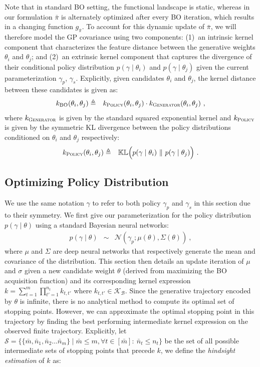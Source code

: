 Note that in standard BO setting, the functional landscape is static, whereas in our formulation $\bar{\pi}$ is alternately optimized after every BO iteration, which results in a changing function $g_{\bar{\pi}}$. To account for this dynamic update of ${\bar{\pi}}$, we will therefore model the GP covariance using two components: (1)~an intrinsic kernel component that characterizes the feature distance between the generative weights $\theta_i$ and $\theta_j$; and (2)~an extrinsic kernel component that captures the divergence of their conditional policy distribution $p(\gamma \mid \theta_i)$ and $p(\gamma \mid \theta_j)$ given the current parameterization $\gamma_p$, $\gamma_s$. Explicitly, given candidates $\theta_i$ and $\theta_j$, the kernel distance between these candidates is given as:
\begin{eqnarray}
k_{\mathrm{BO}}(\theta_i, \theta_j) &\triangleq& k_{\textsc{Policy}}(\theta_i, \theta_j)\cdot k_{\textsc{Generator}}(\theta_i, \theta_j) \ ,
\end{eqnarray}
where $k_{\textsc{Generator}}$ is given by the standard squared exponential kernel and $k_{\textsc{Policy}}$ is given by the symmetric KL divergence between the policy distributions conditioned on $\theta_i$ and $\theta_j$ respectively:
\begin{eqnarray}
k_{\textsc{Policy}}(\theta_i, \theta_j) &\triangleq& \mathbb{KL}\Big(p(\gamma\mid\theta_i) \ \| \ p(\gamma \mid\theta_j)\Big)  \ .
\end{eqnarray}

\subsection{Optimizing Policy Distribution}
\label{app-ks-subsec:pi}
We use the same notation $\gamma$ to refer to both policy $\gamma_p$ and $\gamma_s$ in this section due to their symmetry. We first give our parameterization for the policy distribution $p(\gamma \mid \theta)$ using a standard Bayesian neural networks:
\begin{eqnarray}
p(\gamma \mid \theta) &\sim& \mathcal{N}(\gamma_p; \mu(\theta), \Sigma(\theta)) \ ,
\end{eqnarray}
where $\mu$ and $\Sigma$ are deep neural networks that respectively generate the mean and covariance of the distribution. This section then details an update iteration of $\mu$ and $\sigma$ given a new candidate weight $\theta$ (derived from maximizing the BO acquisition function) and its corresponding kernel expression $k = \sum_{t=1}^m\prod_{t'=1}^{n_t} k_{t, t'}$ where $k_{t, t'} \in \mathcal{K_B}$. Since the generative trajectory encoded by $\theta$ is infinite, there is no analytical method to compute its optimal set of stopping points. However, we can approximate the optimal stopping point in this trajectory by finding the best performing intermediate kernel expression on the observed finite trajectory. Explicitly, let $\mathcal{S} = \{\{\bar{m}, \bar{n}_1, \bar{n}_2 \dots \bar{n}_m\} \mid \bar{m} \leq m, \forall t \in [\bar{m}]: \ \bar{n}_t \leq n_t\}$ be the set of all possible intermediate sets of stopping points that precede $k$, we define the \emph{hindsight estimation} of $k$ as:


